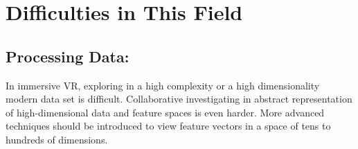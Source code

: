 \documentclass[10pt,twocolumn,letterpaper]{article}
\begin{document}






\section{Difficulties in This Field}
\subsection{Processing Data:}In immersive VR, exploring in a high complexity or a high dimensionality modern data set is difficult. Collaborative investigating in abstract representation of high-dimensional data and feature spaces is even harder. More advanced techniques should be introduced to view feature vectors in a space of tens to hundreds of dimensions.


\setlength{\parindent}{1pc}
\end{document}
